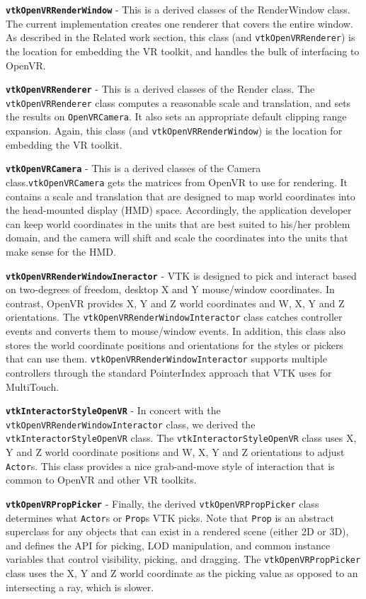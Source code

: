 \textbf{\texttt{vtkOpenVRRenderWindow}} - This is a derived classes of the RenderWindow class. The current implementation creates one renderer that covers the entire window. As described in the Related work section, this class (and \texttt{vtkOpenVRRenderer}) is the location for embedding the VR toolkit, and handles the bulk of interfacing to OpenVR. 

\textbf{\texttt{vtkOpenVRRenderer}} - This is a derived classes of the Render class. The \texttt{vtkOpenVRRenderer} class computes a reasonable scale and translation, and sets the results on \texttt{OpenVRCamera}. It also sets an appropriate default clipping range expansion. Again, this class (and \texttt{vtkOpenVRRenderWindow}) is the location for embedding the VR toolkit.

\textbf{\texttt{vtkOpenVRCamera}} - This is a derived classes of the Camera class.\texttt{vtkOpenVRCamera} gets the matrices from OpenVR to use for rendering. It contains a scale and translation that are designed to map world coordinates into the head-mounted display (HMD) space. Accordingly, the application developer can keep world coordinates in the units that are best suited to his/her problem domain, and the camera will shift and scale the coordinates into the units that make sense for the HMD.

\textbf{\texttt{vtkOpenVRRenderWindowIneractor}} - VTK is designed to pick and interact based on two-degrees of freedom, desktop X and Y mouse/window coordinates. In contrast, OpenVR provides X, Y and Z world coordinates and W, X, Y and Z orientations. The \texttt{vtkOpenVRRenderWindowInteractor} class catches controller events and converts them to mouse/window events. In addition, this class also stores the world coordinate positions and orientations for the styles or pickers that can use them. \texttt{vtkOpenVRRenderWindowInteractor} supports multiple controllers through the standard PointerIndex approach that VTK uses for MultiTouch.

\textbf{\texttt{vtkInteractorStyleOpenVR}} - In concert with the \texttt{vtkOpenVRRenderWindowInteractor} class, we derived the \texttt{vtkInteractorStyleOpenVR} class. The \texttt{vtkInteractorStyleOpenVR} class uses X, Y and Z world coordinate positions and W, X, Y and Z orientations to adjust \texttt{Actor}s. This class provides a nice grab-and-move style of interaction that is common to OpenVR and other VR toolkits.

\textbf{\texttt{vtkOpenVRPropPicker}} - Finally, the derived \texttt{vtkOpenVRPropPicker} class determines what \texttt{Actor}s or \texttt{Prop}s VTK picks. Note that \texttt{Prop} is an abstract superclass for any objects that can exist in a rendered scene (either 2D or 3D), and defines the API for picking, LOD manipulation, and common instance variables that control visibility, picking, and dragging. The \texttt{vtkOpenVRPropPicker} class uses the X, Y and Z world coordinate as the picking value as opposed to an intersecting a ray, which is slower.

